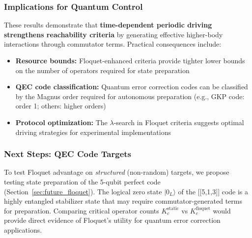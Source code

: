 \subsubsection{Implications for Quantum Control}

These results demonstrate that \textbf{time-dependent periodic driving strengthens reachability criteria} by generating effective higher-body interactions through commutator terms. Practical consequences include:

\begin{itemize}
\item \textbf{Resource bounds:} Floquet-enhanced criteria provide tighter lower bounds on the number of operators required for state preparation
\item \textbf{QEC code classification:} Quantum error correction codes can be classified by the Magnus order required for autonomous preparation (e.g., GKP code: order 1; others: higher orders)
\item \textbf{Protocol optimization:} The $\lambda$-search in Floquet criteria suggests optimal driving strategies for experimental implementations
\end{itemize}

\subsubsection{Next Steps: QEC Code Targets}

To test Floquet advantage on \emph{structured} (non-random) targets, we propose testing state preparation of the 5-qubit perfect code (Section~\ref{sec:future_floquet}). The logical zero state $|0_L\rangle$ of the [[5,1,3]] code is a highly entangled stabilizer state that may require commutator-generated terms for preparation. Comparing critical operator counts $K_c^{\text{static}}$ vs $K_c^{\text{floquet}}$ would provide direct evidence of Floquet's utility for quantum error correction applications.

